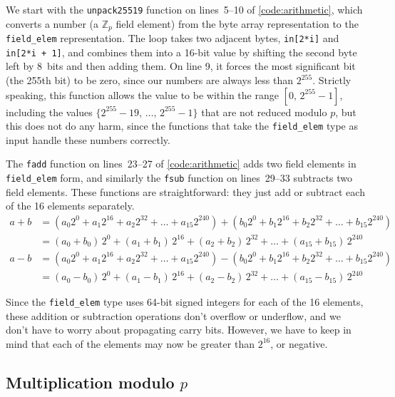 \documentclass[manuscript]{acmart}
\begin{document}
We start with the \verb|unpack25519| function on lines~5--10 of \autoref{code:arithmetic}, which converts a number (a $\mathbb{Z}_p$ field element) from the byte array representation to the \verb|field_elem| representation.
The loop takes two adjacent bytes, \verb|in[2*i]| and \verb|in[2*i + 1]|, and combines them into a 16-bit value by shifting the second byte left by 8~bits and then adding them.
On line 9, it forces the most significant bit (the 255th bit) to be zero, since our numbers are always less than $2^{255}$.
Strictly speaking, this function allows the value to be within the range $[0,\, 2^{255} - 1]$, including the values $\{2^{255} - 19,\, \dots,\, 2^{255} - 1\}$ that are not reduced modulo $p$, but this does not do any harm, since the functions that take the \verb|field_elem| type as input handle these numbers correctly.

The \verb|fadd| function on lines~23--27 of \autoref{code:arithmetic} adds two field elements in \verb|field_elem| form, and similarly the \verb|fsub| function on lines~29--33 subtracts two field elements.
These functions are straightforward: they just add or subtract each of the 16 elements separately.
\begin{align}
    a + b &= (a_0 2^0 + a_1 2^{16} + a_2 2^{32} + \dots + a_{15} 2^{240}) + (b_0 2^0 + b_1 2^{16} + b_2 2^{32} + \dots + b_{15} 2^{240}) \nonumber\\
    &= (a_0 + b_0)\, 2^0 + (a_1 + b_1)\, 2^{16} + (a_2 + b_2)\, 2^{32} + \dots + (a_{15} + b_{15})\, 2^{240} \\[6pt]
    a - b &= (a_0 2^0 + a_1 2^{16} + a_2 2^{32} + \dots + a_{15} 2^{240}) - (b_0 2^0 + b_1 2^{16} + b_2 2^{32} + \dots + b_{15} 2^{240}) \nonumber\\
    &= (a_0 - b_0)\, 2^0 + (a_1 - b_1)\, 2^{16} + (a_2 - b_2)\, 2^{32} + \dots + (a_{15} - b_{15})\, 2^{240}
\end{align}

Since the \verb|field_elem| type uses 64-bit signed integers for each of the 16 elements, these addition or subtraction operations don't overflow or underflow, and we don't have to worry about propagating carry bits.
However, we have to keep in mind that each of the elements may now be greater than $2^{16}$, or negative.

\subsection{Multiplication modulo $p$}\label{sec:multiplication}
\end{document}
